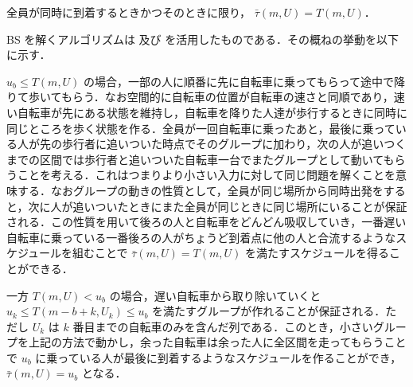 \begin{corollary}\label{corollary:lower-bound-bs-equality}
  全員が同時に到着するときかつそのときに限り， $\bar\tau(m, U) = T(m, U)$．
\end{corollary}

BS を解くアルゴリズムは  及び  を活用したものである．その概ねの挙動を以下に示す．

$u_b \leq T(m, U)$ の場合，一部の人に順番に先に自転車に乗ってもらって途中で降りて歩いてもらう．なお空間的に自転車の位置が自転車の速さと同順であり，速い自転車が先にある状態を維持し，自転車を降りた人達が歩行するときに同時に同じところを歩く状態を作る．全員が一回自転車に乗ったあと，最後に乗っている人が先の歩行者に追いついた時点でそのグループに加わり，次の人が追いつくまでの区間では歩行者と追いついた自転車一台でまたグループとして動いてもらうことを考える．これはつまりより小さい入力に対して同じ問題を解くことを意味する．なおグループの動きの性質として，全員が同じ場所から同時出発をすると，次に人が追いついたときにまた全員が同じときに同じ場所にいることが保証される．この性質を用いて後ろの人と自転車をどんどん吸収していき，一番遅い自転車に乗っている一番後ろの人がちょうど到着点に他の人と合流するようなスケジュールを組むことで $\bar\tau(m, U) = T(m, U)$ を満たすスケジュールを得ることができる．

一方 $T(m, U) < u_b$ の場合，遅い自転車から取り除いていくと $u_k \leq T(m - b + k, U_k) \leq u_b$ を満たすグループが作れることが保証される．ただし $U_k$ は $k$ 番目までの自転車のみを含んだ列である．このとき，小さいグループを上記の方法で動かし，余った自転車は余った人に全区間を走ってもらうことで $u_b$ に乗っている人が最後に到着するようなスケジュールを作ることができ， $\bar\tau(m, U) = u_b$ となる．